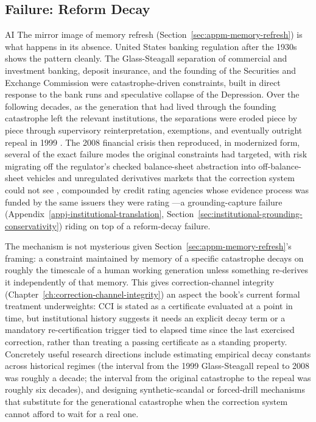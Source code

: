 \begin{refsection}
\section{Failure: Reform Decay}
\label{sec:appm-reform-decay}
\begin{authbar}{AI}
The mirror image of memory refresh (Section~\ref{sec:appm-memory-refresh}) is what happens in its absence. United States banking regulation after the 1930s shows the pattern cleanly. The Glass-Steagall separation of commercial and investment banking, deposit insurance, and the founding of the Securities and Exchange Commission were catastrophe-driven constraints, built in direct response to the bank runs and speculative collapse of the Depression. Over the following decades, as the generation that had lived through the founding catastrophe left the relevant institutions, the separations were eroded piece by piece through supervisory reinterpretation, exemptions, and eventually outright repeal in 1999 \autocite{kroszner2014regulation}. The 2008 financial crisis then reproduced, in modernized form, several of the exact failure modes the original constraints had targeted, with risk migrating off the regulator's checked balance-sheet abstraction into off-balance-sheet vehicles and unregulated derivatives markets that the correction system could not see \autocite{fcic2011report}, compounded by credit rating agencies whose evidence process was funded by the same issuers they were rating \autocite{white2010ratingagencies}---a grounding-capture failure (Appendix~\ref{appj-institutional-translation}, Section~\ref{sec:institutional-grounding-conservativity}) riding on top of a reform-decay failure.

The mechanism is not mysterious given Section~\ref{sec:appm-memory-refresh}'s framing: a constraint maintained by memory of a specific catastrophe decays on roughly the timescale of a human working generation unless something re-derives it independently of that memory. This gives correction-channel integrity (Chapter~\ref{ch:correction-channel-integrity}) an aspect the book's current formal treatment underweights: CCI is stated as a certificate evaluated at a point in time, but institutional history suggests it needs an explicit decay term or a mandatory re-certification trigger tied to elapsed time since the last exercised correction, rather than treating a passing certificate as a standing property. Concretely useful research directions include estimating empirical decay constants across historical regimes (the interval from the 1999 Glass-Steagall repeal to 2008 was roughly a decade; the interval from the original catastrophe to the repeal was roughly six decades), and designing synthetic-scandal or forced-drill mechanisms that substitute for the generational catastrophe when the correction system cannot afford to wait for a real one.


\end{authbar}
\end{refsection}
